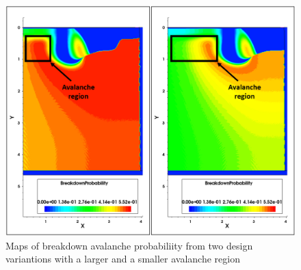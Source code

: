 \documentclass[10pt,a4paper,twocolumn]{article}
\begin{document}
\begin{figure}[h!]
\centering
\includegraphics[scale=0.45]{../pictures/BrPMaps.png}
\caption{Maps of breakdown avalanche probabiliity from two design variantions with a larger and a smaller avalanche region}
\end{figure}






\end{document}
